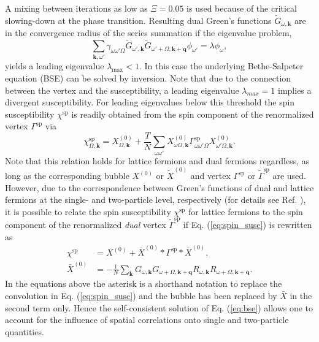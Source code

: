 \documentclass[aps,prb,twocolumn,amsmath,notitlepage,floatfix,footinbib,superscriptaddress,showpacs, showkeys]{revtex4-1}
\newcommand{\kay}{\mathbf{k}}
\newcommand{\cue}{\mathbf{q}}
\begin{document}
\begin{appendix}
A mixing between iterations as low as $\Xi=0.05$ is used because of the critical slowing-down at the phase transition.
Resulting dual Green's functions $\tilde{G}_{\omega,\kay}$ are in the convergence radius of the series summation if the eigenvalue problem,
\begin{equation}
\sum_{\kay,\omega'}\gamma_{\omega\omega'\Omega}\tilde{G}_{\omega',\kay}\tilde{G}_{\omega'+\Omega,\kay+\cue}\phi_{\omega'}=\lambda\phi_{\omega},
\end{equation}
yields a leading eigenvalue $\lambda_\text{max}<1$. In this case the underlying Bethe-Salpeter equation (BSE) can be solved by inversion. Note that due to the connection between the vertex and the susceptibility, a leading eigenvalue $\lambda_{max} = 1$ implies a divergent susceptibility. For leading eigenvalues below this threshold the spin susceptibility $\chi^{\text{sp}}$ is readily obtained from the spin component of the renormalized vertex $\Gamma^{\text{sp}}$ via
\begin{equation}\label{eq:spin_susc}
\chi^{\text{sp}}_{\Omega,\kay}=X^{(0)}_{\Omega,\kay}+\frac{T}{N}\sum_{\omega\omega'} X^{(0)}_{\omega\Omega,\kay}\Gamma^{\text{sp}}_{\omega\omega'\Omega} X^{(0)}_{\omega'\Omega,\kay}.
\end{equation}
Note that this relation holds for lattice fermions and dual fermions regardless, as long as the corresponding bubble $X^{(0)}$ or $\tilde{X}^{(0)}$ and vertex $\Gamma^{\text{sp}}$ or $\tilde{\Gamma}^{\text{sp}}$ are used. However, due to the correspondence between Green's functions of dual and lattice fermions at the single- and two-particle level, respectively (for details see Ref. \cite{bluebible}), it is possible to relate the spin susceptibility $\chi^{\text{sp}}$ for lattice fermions to the spin component of the renormalized \textit{dual} vertex $\tilde{\Gamma}^{\text{sp}}$ if Eq. (\ref{eq:spin_susc}) is rewritten as
\begin{align}
\chi^{\text{sp}} &=X^{(0)}+\bar{X}^{(0)}\ast\Gamma^{\text{sp}}\ast\bar{X}^{(0)}, \\
\bar{X}^{(0)} &=-\frac{1}{N} \sum_\kay G_{\omega,\kay}G_{\omega+\Omega,\kay+\cue}R_{\omega,\kay}R_{\omega+\Omega,\kay+\cue}.
\end{align}
In the equations above the asterisk is a shorthand notation to replace the convolution in Eq. (\ref{eq:spin_susc}) and the bubble has been replaced by $\bar{X}$ in the second term only. Hence the self-consistent solution of Eq. (\ref{eq:bse}) allows one to account for the influence of spatial correlations onto single and two-particle quantities.
 

\end{appendix}
\end{document}
